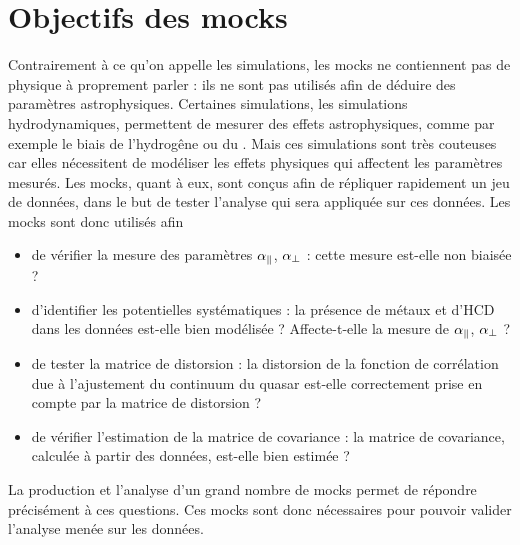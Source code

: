 \documentclass[11pt, twoside, a4paper, openright]{report}
\begin{document}
\section{Objectifs des mocks}
Contrairement à ce qu'on appelle les simulations, les mocks ne contiennent pas de physique à proprement parler : ils ne sont pas utilisés afin de déduire des paramètres astrophysiques. Certaines simulations, les simulations hydrodynamiques, permettent de mesurer des effets astrophysiques, comme par exemple le biais de l'hydrogêne ou du \lya{}. Mais ces simulations sont très couteuses car elles nécessitent de modéliser les effets physiques qui affectent les paramètres mesurés.
Les mocks, quant à eux, sont conçus afin de répliquer rapidement un jeu de données, dans le but de tester l'analyse qui sera appliquée sur ces données.
Les mocks sont donc utilisés afin
\begin{itemize}[label=$\bullet$]
\item de vérifier la mesure des paramètres $\alpha_{\parallel}{}$, $\alpha_{\perp}{}$ : cette mesure est-elle non biaisée ?
\item d'identifier les potentielles systématiques : la présence de métaux et d'HCD dans les données est-elle bien modélisée ? Affecte-t-elle la mesure de $\alpha_{\parallel}{}$, $\alpha_{\perp}{}$ ?
\item de tester la matrice de distorsion : la distorsion de la fonction de corrélation due à l'ajustement du continuum du quasar est-elle correctement prise en compte par la matrice de distorsion ?
\item de vérifier l'estimation de la matrice de covariance : la matrice de covariance, calculée à partir des données, est-elle bien estimée ?
\end{itemize}
La production et l'analyse d'un grand nombre de mocks permet de répondre précisément à ces questions. Ces mocks sont donc nécessaires pour pouvoir valider l'analyse menée sur les données.
\end{document}
